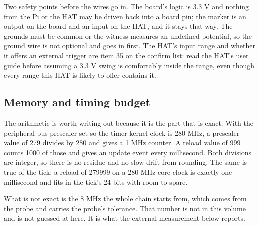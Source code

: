 Two safety points before the wires go in. The board's logic is 3.3 V and
nothing from the Pi or the HAT may be driven back into a board pin; the marker
is an output on the board and an input on the HAT, and it stays that way. The
grounds must be common or the witness measures an undefined potential, so the
ground wire is not optional and goes in first. The HAT's input range and
whether it offers an external trigger are item 35 on the confirm list: read the
HAT's user guide before assuming a 3.3 V swing is comfortably inside the range,
even though every range this HAT is likely to offer contains it.

\subsection*{Memory and timing budget}


The arithmetic is worth writing out because it is the part that is exact. With
the peripheral bus prescaler set so the timer kernel clock is 280 MHz, a
prescaler value of 279 divides by 280 and gives a 1 MHz counter. A reload value
of 999 counts 1000 of those and gives an update event every millisecond. Both
divisions are integer, so there is no residue and no slow drift from rounding.
The same is true of the tick: a reload of 279999 on a 280 MHz core clock is
exactly one millisecond and fits in the tick's 24 bits with room to spare.

What is not exact is the 8 MHz the whole chain starts from, which comes from the
probe and carries the probe's tolerance. That number is not in this volume and
is not guessed at here. It is what the external measurement below reports.

